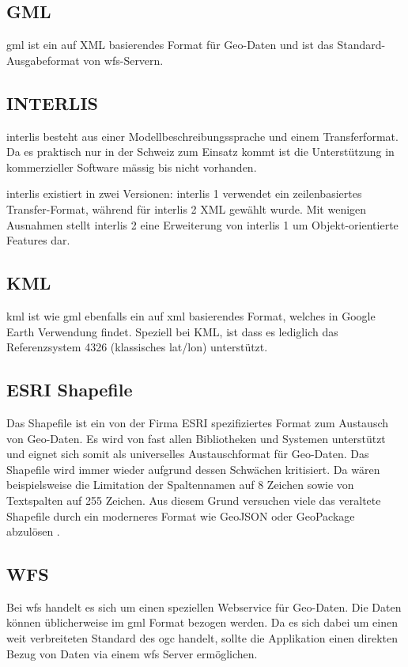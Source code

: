 \subsection{GML}
\gls{gml} ist ein auf XML basierendes Format für Geo-Daten und ist das Standard-Ausgabeformat von \acs{wfs}-Servern.


\subsection{INTERLIS}
\gls{interlis} besteht aus einer Modellbeschreibungssprache und einem Transferformat. Da es praktisch nur in der Schweiz zum Einsatz kommt ist die Unterstützung in kommerzieller Software mässig bis nicht vorhanden.

\gls{interlis} existiert in zwei Versionen: \gls{interlis} 1 verwendet ein zeilenbasiertes Transfer-Format, während für \gls{interlis} 2 XML gewählt wurde. Mit wenigen Ausnahmen stellt \gls{interlis} 2 eine Erweiterung von \gls{interlis} 1 um Objekt-orientierte Features dar.

\subsection{KML}
\gls{kml} ist wie \gls{gml} ebenfalls ein auf \acs{xml} basierendes Format, welches in Google Earth Verwendung findet. Speziell bei KML, ist dass es lediglich das Referenzsystem 4326 (klassisches lat/lon) unterstützt.


\subsection{ESRI Shapefile}
Das Shapefile ist ein von der Firma ESRI spezifiziertes Format zum Austausch von Geo-Daten. Es wird von fast allen Bibliotheken und Systemen unterstützt und eignet sich somit als universelles Austauschformat für Geo-Daten. Das Shapefile wird immer wieder aufgrund dessen Schwächen kritisiert. Da wären beispielsweise die Limitation der Spaltennamen auf 8 Zeichen sowie von Textspalten auf 255 Zeichen. Aus diesem Grund versuchen viele das veraltete Shapefile durch ein moderneres Format wie GeoJSON oder GeoPackage abzulösen \cite{sfkeller}.

\subsection{WFS}
Bei \gls{wfs} handelt es sich um einen speziellen Webservice für Geo-Daten. Die Daten können üblicherweise im \gls{gml} Format bezogen werden. Da es sich dabei um einen weit verbreiteten Standard des \gls{ogc} handelt, sollte die Applikation einen direkten Bezug von Daten via einem \acs{wfs} Server ermöglichen.


